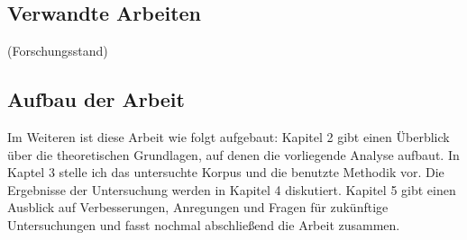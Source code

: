 \begin{comment}
Pregunta
--------
Vull investigar si l'altre idioma es fa servir en contextos específics.
La suposició inicial és que sí, que si tenim un text escrit principalment en castellà, trobarem expresions en anglès en casos especials,
per exemple per designar termes tècnincs o frases fixes que no en tenen una traducció exacta en castellà.
Esperem també que observarem la tendecia inversa: que les frases fixes del castellà es mantenen en textos angleses.
Un altre cas de mantenir l'idioma "original" seria si es tracte de coses típiques d'una regió que no es poden trobar als llocs on es parla l'altre idioma (per exemple plantes, animals, menjar, etc.).
A més a més, seria interessant observar si frases de "l'altra llengua" s'utilitzan a causa de tenir un estatut més "alt" o amb l'objectiu de vender un producte.

Vinculació a la investigació existent
------------------------------------
El tema del billingüísme castellà-anglès als Estats Units no és nou i ja existeixen bastants treballs que investigan aquest fenomen.
Per exemple la investigació d'Ana Zentella i Ricardo Otheguy es va concentrar massa al billingüisme i l'ensenyament,
als diferents processos que ocorren en casos de coexistència de més d'una llengua.
Tanmateix, seria interessant examinar de quina manera els mitjans de comunicació (i en aquest cas concret, les revistes feminines) utilitzan dos codis i,
d'aixó intentar a concloure quin és l'objectiu que persegueixin.

------------------------------------

\end{comment}

\subsection{Verwandte Arbeiten}
(Forschungsstand)

\begin{comment}
Was soll dann hier rein?
Ich hab keine Ahnung ob jemand schon so was analysiert hat..
Eine oberflächliche Internetsuche sagt ja :)

Soll das in die Intro? Oder eigener Kapitel? Oder in 2.?
Ich glaub, ich machs in die Intro:
[Mahootian05]
[Ticknor12]
\end{comment}

\subsection{Aufbau der Arbeit}

Im Weiteren ist diese Arbeit wie folgt aufgebaut:
Kapitel 2 gibt einen Überblick über die theoretischen Grundlagen, auf denen die vorliegende Analyse aufbaut.
In Kaptel 3 stelle ich das untersuchte Korpus und die benutzte Methodik vor.
Die Ergebnisse der Untersuchung werden in Kapitel 4 diskutiert.
Kapitel 5 gibt einen Ausblick auf Verbesserungen, Anregungen und Fragen für zukünftige Untersuchungen und fasst nochmal abschließend die Arbeit zusammen.

